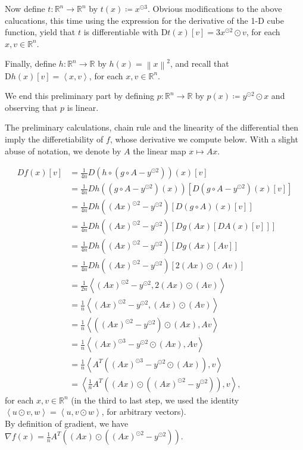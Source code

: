 \documentclass{article}
\theoremstyle{definition}
\theoremstyle{remark}
\newcommand{\R}{\mathbb{R}}
\newcommand \norm[1]{\left\lVert #1 \right\rVert}
\newcommand\inn [2]{\left\langle #1{,}#2\right\rangle}
\newcommand{\D}{\mathrm D}
\begin{document}
Now define $t\colon \R^n\to \R^n$ by $t(x)\coloneq x^{\odot 3}$. Obvious modifications to the above calucations, this time using the expression for the derivative of the 1-D cube function, yield that $t$ is differentiable with $\D t(x)[v]=3x^{\odot 2}\odot v$, for each $x,v\in \R^n$.

Finally, define $h\colon \R^n\to \R$ by $h(x)=\norm x^2$, and recall that $\D h(x)[v]=\inn{x}{v}$, for each $x,v\in \R^n$.

We end this preliminary part by defining $p\colon \R^n\to \R$ by $p(x)\coloneq y^{\odot 2}\odot x$ and observing that $p$ is linear.

The preliminary calculations, chain rule and the linearity of the differential then imply the differetiability of $f$, whose derivative we compute below. With a slight abuse of notation, we denote by $A$ the linear map $x\mapsto Ax$.

\begin{align*}
Df(x)[v]
&= \frac{1}{4n}
D\left(h\circ(g\circ A-y^{\odot 2})\right)(x)[v]\\
&= \frac{1}{4n}
Dh\left((g\circ A-y^{\odot 2})(x)\right)
\left[D(g\circ A-y^{\odot 2})(x)[v]\right]\\
&= \frac{1}{4n}
Dh\left((Ax)^{\odot 2}-y^{\odot 2}\right)
\left[D(g\circ A)(x)[v]\right]\\
&= \frac{1}{4n}
Dh\left((Ax)^{\odot 2}-y^{\odot 2}\right)
\left[Dg(Ax)[DA(x)[v]]\right]\\
&= \frac{1}{4n}
Dh\left((Ax)^{\odot 2}-y^{\odot 2}\right)
\left[Dg(Ax)[Av]\right]\\
&= \frac{1}{4n}
Dh\left((Ax)^{\odot 2}-y^{\odot 2}\right)
\left[2(Ax)\odot(Av)\right]\\
&= \frac{1}{2n}
\left\langle
(Ax)^{\odot 2}-y^{\odot 2},
2(Ax)\odot(Av)
\right\rangle\\
&= \frac{1}{n}
\left\langle
(Ax)^{\odot 2}-y^{\odot 2},
(Ax)\odot(Av)
\right\rangle\\
&= \frac{1}{n}
\left\langle
\left((Ax)^{\odot 2}-y^{\odot 2}\right)\odot(Ax),
Av
\right\rangle\\
&= \frac{1}{n}
\left\langle
(Ax)^{\odot 3}-y^{\odot 2}\odot(Ax),
Av
\right\rangle\\
&= \frac{1}{n}
\left\langle
A^T\left((Ax)^{\odot 3}-y^{\odot 2}\odot(Ax)\right),
v
\right\rangle\\
&=\left\langle
\frac{1}{n}A^T
\left((Ax)\odot\left((Ax)^{\odot 2}-y^{\odot 2}\right)\right),
v
\right\rangle,
\end{align*}
for each $x,v\in \R^n$
(in the third to last step, we used the identity $\inn{u\odot v}{w}=\inn{u}{v\odot w}$, for arbitrary vectors).\\
By definition of gradient, we have
\(
\nabla f(x)=\frac{1}{n}A^T
\left((Ax)\odot\left((Ax)^{\odot 2}-y^{\odot 2}\right)\right).
\)
\end{document}
